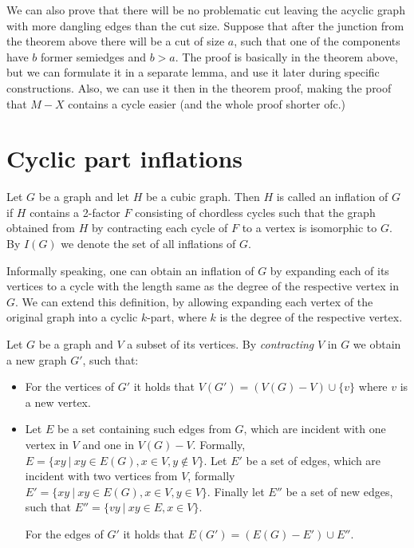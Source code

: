 \documentclass[12pt, twoside]{book}
\begin{document}
\todo{}We can also prove that there will be no problematic cut leaving the acyclic graph with more dangling edges than the cut size. Suppose that after the junction from the theorem above there will be a cut of size $a$, such that one of the components have $b$ former semiedges and $b>a$. The proof is basically in the theorem above, but we can formulate it in a separate lemma, and use it later during specific constructions. Also, we can use it then in the theorem proof, making the proof that $M-X$ contains a cycle easier (and the whole proof shorter ofc.)

\section{Cyclic part inflations}\label{sec:cyclic-part-inflations}

\begin{definition}
	Let $G$ be a graph and let $H$ be a cubic graph. Then $H$ is called an inflation of $G$ if $H$ contains a 2-factor $F$ consisting of chordless cycles such that the graph obtained from $H$ by contracting each cycle of $F$ to a vertex is isomorphic to $G$. By $I(G)$ we denote the set of all inflations of $G$.
\end{definition}

Informally speaking, one can obtain an inflation of $G$ by expanding each of its vertices to a cycle with the length same as the degree of the respective vertex in $G$. We can extend this definition, by allowing expanding each vertex of the original graph into a cyclic $k$-part, where $k$ is the degree of the respective vertex.


Let $G$ be a graph and $V$ a subset of its vertices. By \textit{contracting} $V$ in $G$ we obtain a new graph $G'$, such that:
\begin{itemize}
	\item For the vertices of $G'$ it holds that $V(G') = (V(G)-V)\cup \{v\}$ where $v$ is a new vertex.
	\item Let $E$ be a set containing such edges from $G$, which are incident with one vertex in $V$ and one in $V(G)-V$. Formally, ${E=\{xy~|~xy\in E(G), x\in V, y\notin V\}}$. Let $E'$ be a set of edges, which are incident with two vertices from $V$, formally ${E'=\{xy ~|~ xy\in E(G), x\in V, y\in V\}}$. Finally let $E''$ be a set of new edges, such that $E''=\{vy~|~ xy\in E, x\in V\}$.
	
	For the edges of $G'$ it holds that ${E(G')=(E(G)-E')\cup E''}$.
\end{itemize}
\end{document}
